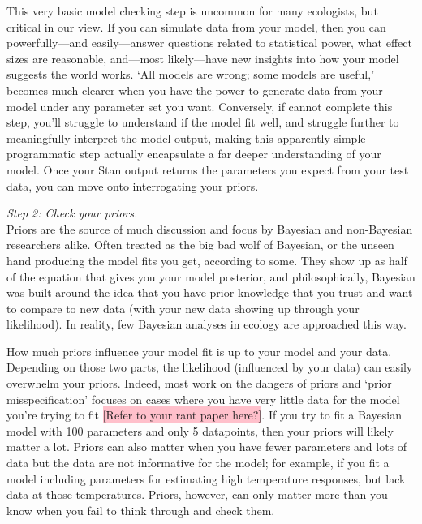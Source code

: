 \documentclass[11pt]{article}
\begin{document}
{This very basic model checking step is uncommon for many ecologists, but critical in our view. If you can simulate data from your model, then you can powerfully---and easily---answer questions related to statistical power, what effect sizes are reasonable, and---most likely---have new insights into how your model suggests the world works. `All models are wrong; some models are useful,' becomes much clearer when you have the power to generate data from your model under any parameter set you want. Conversely, if cannot complete this step, you'll struggle to understand if the model fit well, and struggle further to meaningfully interpret the model output, making this apparently simple programmatic step actually encapsulate a far deeper understanding of your model. Once your \textsf{Stan} output returns the parameters you expect from your test data, you can move onto interrogating your priors. 

\emph{Step 2: Check your priors.} \\
Priors are the source of much discussion and focus by Bayesian and non-Bayesian researchers alike. Often treated as the big bad wolf of Bayesian, or the unseen hand producing the model fits you get, according to some. They show up as half of the equation that gives you your model posterior, and philosophically, Bayesian was built around the idea that you have prior knowledge that you trust and want to compare to new data (with your new data showing up through your likelihood). In reality, few Bayesian analyses in ecology are approached this way. 

How much priors influence your model fit is up to your model and your data. Depending on those two parts, the likelihood (influenced by your data) can easily overwhelm your priors. Indeed, most work on the dangers of priors and `prior misspecification'  focuses on cases where you have very little data for the model you're trying to fit \colorbox{pink}{[Refer to your rant paper here?]}. If you try to fit a Bayesian model with 100 parameters and only 5 datapoints, then your priors will likely matter a lot. Priors can also matter when you have fewer parameters and lots of data but the data are not informative for the model; for example, if you fit a model including parameters for estimating high temperature responses, but lack data at those temperatures. Priors, however, can only matter more than you know when you fail to think through and check them. 

}
\end{document}
